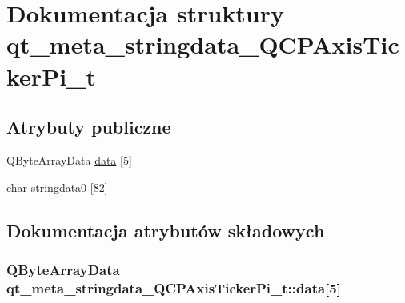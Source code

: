 \hypertarget{structqt__meta__stringdata___q_c_p_axis_ticker_pi__t}{}\section{Dokumentacja struktury qt\+\_\+meta\+\_\+stringdata\+\_\+\+Q\+C\+P\+Axis\+Ticker\+Pi\+\_\+t}
\label{structqt__meta__stringdata___q_c_p_axis_ticker_pi__t}
\subsection*{Atrybuty publiczne}
\begin{DoxyCompactItemize}
\item 
Q\+Byte\+Array\+Data \hyperlink{structqt__meta__stringdata___q_c_p_axis_ticker_pi__t_a9f99bf64eee1204b7290801f16f2f970}{data} \mbox{[}5\mbox{]}
\item 
char \hyperlink{structqt__meta__stringdata___q_c_p_axis_ticker_pi__t_a09df8d6e526c01eb8d476aad32b2ab37}{stringdata0} \mbox{[}82\mbox{]}
\end{DoxyCompactItemize}


\subsection{Dokumentacja atrybutów składowych}
\subsubsection[{\texorpdfstring{data}{data}}]{\setlength{\rightskip}{0pt plus 5cm}Q\+Byte\+Array\+Data qt\+\_\+meta\+\_\+stringdata\+\_\+\+Q\+C\+P\+Axis\+Ticker\+Pi\+\_\+t\+::data\mbox{[}5\mbox{]}}\hypertarget{structqt__meta__stringdata___q_c_p_axis_ticker_pi__t_a9f99bf64eee1204b7290801f16f2f970}{}\label{structqt__meta__stringdata___q_c_p_axis_ticker_pi__t_a9f99bf64eee1204b7290801f16f2f970}
